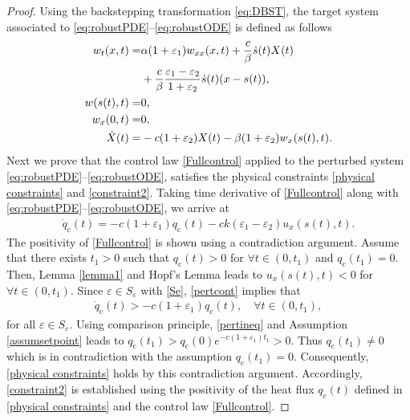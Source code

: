 \documentclass[journal]{IEEEtran}
\begin{document}
\begin{proof}
Using the backstepping transformation \eqref{eq:DBST}, the target system  associated to \eqref{eq:robustPDE}--\eqref{eq:robustODE} is defined as  follows
\begin{align}\label{eq:tarrobustPDE}
w_t(x,t)=& \alpha (1+\varepsilon_1)w_{xx}(x,t)+\frac{c}{\beta}\dot{s}(t) X(t)\notag\\
&+ \frac{c }{\beta }\frac{\varepsilon_1-\varepsilon_2}{1+\varepsilon_2} \dot{s}(t) (x-s(t)), \\
\label{eq:tarrobustBC1}w(s(t),t) =& 0, \\
\label{eq:robusDBSu}w_x(0,t) =& 0, \\
\label{eq:tarrobustODE}\dot{X}(t)=&-c(1+\varepsilon_2)X(t)-\beta(1+\varepsilon_2) w_x(s(t),t). 
\end{align}
Next we prove that the control law  \eqref{Fullcontrol}   applied to the perturbed system  \eqref{eq:robustPDE}--\eqref{eq:robustODE}, satisfies the  physical constraints \eqref{physical constraints} and \eqref{constraint2}.
Taking time derivative of \eqref{Fullcontrol} along with \eqref{eq:robustPDE}--\eqref{eq:robustODE}, we arrive at
\begin{align}\label{pertcont}
\dot{q}_{{\mathrm c}}(t)=-c (1+\varepsilon_1)  q_{{\mathrm c}}(t)-c k \left(\varepsilon_1-\varepsilon_2\right)  u_x(s(t),t). 
\end{align}
The positivity of \eqref{Fullcontrol}  is shown using a contradiction argument. Assume that there exists $ t_1>0$ such that $q_{{\mathrm c}}(t)>0$ for $\forall t \in(0,t_1)$ and $q_{{\mathrm c}}(t_1) = 0$. Then, Lemma \ref{lemma1} and Hopf's Lemma leads to $u_x(s(t),t)<0$ for $\forall t \in(0,t_1)$. Since $\varepsilon \in S_{\varepsilon}$ with \eqref{Se}, \eqref{pertcont} implies that
\begin{align}\label{pertineq}
\dot{q}_{{\mathrm c}}(t)> -c (1+\varepsilon_1)  q_{{\mathrm c}}(t), \quad \forall t\in(0,t_1), 
\end{align}
for all $\varepsilon \in S_{\varepsilon}$. Using comparison principle, \eqref{pertineq} and Assumption \ref{assumsetpoint} leads to $q_{{\mathrm c}}(t_1) > q_{{\mathrm c}}(0) e^{-c(1+\varepsilon_1) t_1} >0$. Thus $q_{{\mathrm c}}(t_1)\neq 0$   which is in contradiction with  the assumption $q_{{\mathrm c}}(t_1) = 0$. Consequently,  \eqref{physical constraints} holds by this contradiction argument. Accordingly, \eqref{constraint2} is established using the positivity of the heat flux $q_c(t)$ defined in  \eqref{physical constraints} and the control law \eqref{Fullcontrol}. 


\end{proof}
\end{document}
